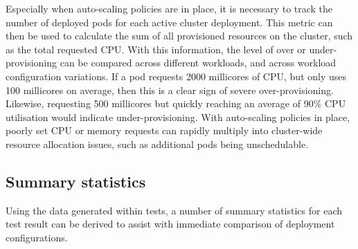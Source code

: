 Especially when auto-scaling policies are in place, it is necessary to track the number of deployed pods for each active cluster deployment. This metric can then be used to calculate the sum of all provisioned resources on the cluster, such as the total requested CPU. With this information, the level of over or under-provisioning can be compared across different workloads, and across workload configuration variations. If a pod requests 2000 millicores of CPU, but only uses 100 millicores on average, then this is a clear sign of severe over-provisioning. Likewise, requesting 500 millicores but quickly reaching an average of 90\% CPU utilisation would indicate under-provisioning. With auto-scaling policies in place, poorly set CPU or memory requests can rapidly multiply into cluster-wide resource allocation issues, such as additional pods being unschedulable.

\subsection{Summary statistics}

Using the data generated within tests, a number of summary statistics for each test result can be derived to assist with immediate comparison of deployment configurations.

